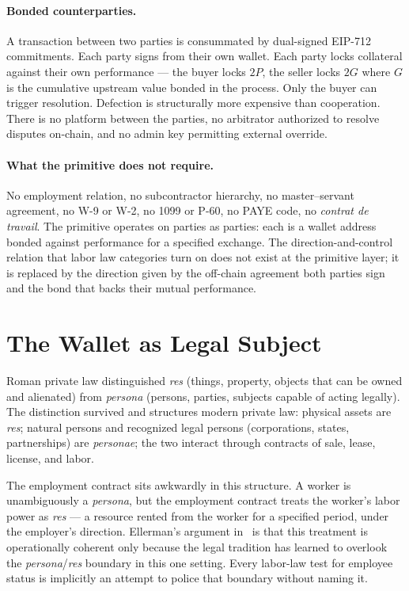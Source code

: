 \documentclass[11pt,a4paper]{article}
\theoremstyle{remark}
\begin{document}
\paragraph{Bonded counterparties.}
A transaction between two parties is consummated by dual-signed
EIP-712 commitments. Each party signs from their own wallet. Each
party locks collateral against their own performance --- the buyer
locks $2P$, the seller locks $2G$ where $G$ is the cumulative
upstream value bonded in the process. Only the buyer can trigger
resolution. Defection is structurally more expensive than
cooperation. There is no platform between the parties, no
arbitrator authorized to resolve disputes on-chain, and no admin
key permitting external override.

\paragraph{What the primitive does not require.}
No employment relation, no subcontractor hierarchy, no master--servant
agreement, no W-9 or W-2, no 1099 or P-60, no PAYE code, no
\emph{contrat de travail}. The primitive operates on parties as
parties: each is a wallet address bonded against performance for a
specified exchange. The direction-and-control relation that labor
law categories turn on does not exist at the primitive layer; it is
replaced by the direction given by the off-chain agreement both
parties sign and the bond that backs their mutual performance.

\section{The Wallet as Legal Subject}
\label{sec:wallet}

Roman private law distinguished \emph{res} (things, property,
objects that can be owned and alienated) from \emph{persona}
(persons, parties, subjects capable of acting legally). The
distinction survived and structures modern private law: physical
assets are \emph{res}; natural persons and recognized legal
persons (corporations, states, partnerships) are \emph{personae};
the two interact through contracts of sale, lease, license, and
labor.

The employment contract sits awkwardly in this structure. A worker
is unambiguously a \emph{persona}, but the employment contract
treats the worker's labor power as \emph{res} --- a resource
rented from the worker for a specified period, under the
employer's direction. Ellerman's argument
in~ is that this treatment is operationally
coherent only because the legal tradition has learned to overlook
the \emph{persona}/\emph{res} boundary in this one setting. Every
labor-law test for employee status is implicitly an attempt to
police that boundary without naming it.
\end{document}
